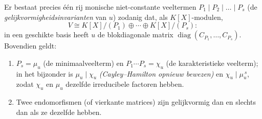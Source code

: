 \begin{theorem}
\label{thm:b3:modules:frobenius}
Er bestaat precies één rij monische niet-constante veeltermen $P_1
\mid P_2 \mid \dots \mid P_s$ (de
\emph{gelijkvormigheidsinvarianten}
van $u$) zodanig dat, als $K[X]$-modulen,
\[
V \cong K[X]/(P_1) \oplus \cdots \oplus K[X]/(P_s):
\]
in een geschikte basis heeft $u$ de blokdiagonale matrix
$\operatorname{diag}(C_{P_1}, \dots, C_{P_s})$. Bovendien geldt:
\begin{enumerate}
  \item $P_s = \mu_u$ (de minimaalveelterm) en $P_1\cdots P_s =
        \chi_u$ (de karakteristieke veelterm); in het bijzonder is
        $\mu_u \mid \chi_u$ \emph{(Cayley--Hamilton opnieuw
        bewezen)} en $\chi_u \mid \mu_u^{\,s}$, zodat $\chi_u$ en
        $\mu_u$ dezelfde irreducibele factoren hebben.
  \item Twee endomorfismen (of vierkante matrices) zijn
        gelijkvormig dan en slechts dan als ze dezelfde
         hebben.
\end{enumerate}
\end{theorem}

